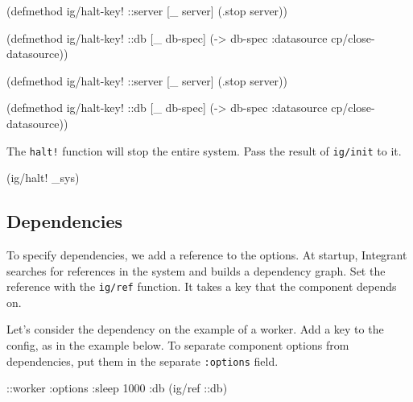 \ifnarrow

\begin{english}
  \begin{clojure}
(defmethod ig/halt-key! ::server
  [_ server]
  (.stop server))

(defmethod ig/halt-key! ::db
  [_ db-spec]
  (-> db-spec
      :datasource
      cp/close-datasource))
  \end{clojure}
\end{english}

\else

\begin{english}
  \begin{clojure}
(defmethod ig/halt-key! ::server
  [_ server]
  (.stop server))

(defmethod ig/halt-key! ::db
  [_ db-spec]
  (-> db-spec :datasource cp/close-datasource))
  \end{clojure}
\end{english}

\fi

\noindent
The \verb|halt!| function will stop the entire system. Pass the result of \verb|ig/init| to it.

\begin{english}
  \begin{clojure}
(ig/halt! _sys)
  \end{clojure}
\end{english}

\subsection{Dependencies}


To specify dependencies, we add a reference to the options. At startup, Integrant searches for references in the system and builds a dependency graph. Set the reference with the \verb|ig/ref| function. It takes a key that the component depends on.

Let's consider the dependency on the example of a worker. Add a key to the config, as in the example below. To separate component options from dependencies, put them in the separate \verb|:options| field.

\begin{english}
  \begin{clojure}
{::worker {:options {:sleep 1000}
           :db (ig/ref ::db)}}
  \end{clojure}
\end{english}

